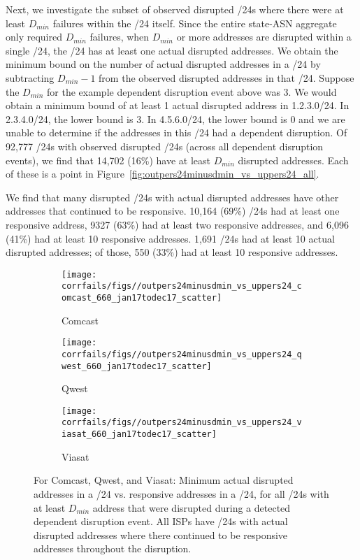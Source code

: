  Next, we investigate the subset of observed disrupted /24s where there
were at least $D_{min}$ failures within the /24 itself. Since the
entire state-ASN aggregate only required $D_{min}$ failures, when
$D_{min}$ or more addresses are disrupted within a single /24, the /24
has at least one actual disrupted addresses. We obtain the minimum bound on
the number of actual disrupted addresses in a /24 by subtracting
$D_{min} - 1$ from the observed disrupted addresses in that /24. Suppose the
$D_{min}$ for the example dependent disruption event above was 3. We would obtain a minimum bound of at least 1
actual disrupted address in 1.2.3.0/24. In 2.3.4.0/24, the lower bound
is 3. In 4.5.6.0/24, the lower bound is 0 and we are unable to
determine if the addresses in this /24 had a dependent disruption. Of 92,777 /24s with observed disrupted /24s (across all dependent
disruption events), we find that 14,702 (16\%) have at least $D_{min}$
disrupted addresses. Each of these is a point in
Figure~\ref{fig:outpers24minusdmin_vs_uppers24_all}.

We find that many disrupted /24s with actual disrupted addresses have other addresses that continued to be responsive. 10,164 (69\%)
/24s had at least one responsive address, 9327 (63\%) had at least two responsive addresses, and 6,096 (41\%) had at least 10
responsive addresses. 1,691 /24s had at least 10 actual disrupted addresses; of those, 550 (33\%) had at least 10
responsive addresses.

\begin{figure*}[t]
  \begin{subfigure}[t]{0.32\linewidth}
    \centering
    \texttt{[image: corrfails/figs//outpers24minusdmin\_vs\_uppers24\_comcast\_660\_jan17todec17\_scatter]}
    \caption{
      \label{fig:outpers24minusdmin_vs_uppers24_comcast}
      Comcast}
  \end{subfigure}
  \hfill
  \begin{subfigure}[t]{0.32\linewidth}
    \centering
    \texttt{[image: corrfails/figs//outpers24minusdmin\_vs\_uppers24\_qwest\_660\_jan17todec17\_scatter]}
    \caption{
      \label{fig:outpers24minusdmin_vs_uppers24_qwest}
      Qwest}
  \end{subfigure}
  \hfill
  \begin{subfigure}[t]{0.32\linewidth}
    \centering
    \texttt{[image: corrfails/figs//outpers24minusdmin\_vs\_uppers24\_viasat\_660\_jan17todec17\_scatter]}
    \caption{
      \label{fig:outpers24minusdmin_vs_uppers24_viasat}
      Viasat}
  \end{subfigure}
  \caption[Minimum actual disrupted addresses in a /24 vs. responsive
  addresses in a /24 for Comcast, Qwest, and Viasat]{
  \label{fig:outpers24minusdmin_vs_uppers24_isp}
For Comcast, Qwest, and Viasat: Minimum actual disrupted addresses in a /24 vs. responsive addresses in a /24, for all /24s with
at least $D_{min}$ address that were disrupted during a detected dependent
disruption event. All ISPs have /24s with actual disrupted addresses where there continued to be responsive addresses throughout the disruption.
}
\end{figure*}


